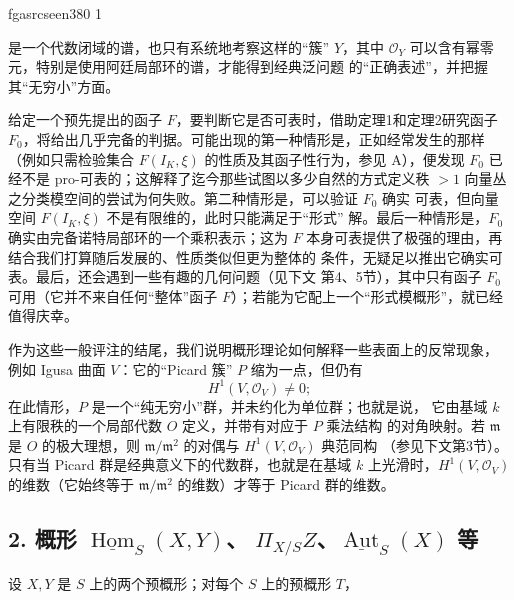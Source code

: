 \documentclass[12pt,twoside,openany]{book}
\numberwithin{equation}{section}
\newcommand{\fgaunitid}{unbound}
\newcommand{\src}[1]{%
  \phantomsection
  \hypertarget{src:\fgaunitid:#1}{}%
  \hypertarget{fga.\fgaunitid.p#1}{}%
  \ifcsname fgasrcseen#1\endcsname\else
    \expandafter\gdef\csname fgasrcseen#1\endcsname{1}%
    \hypertarget{src:#1}{}%
  \fi
  \marginpar{\raggedleft\footnotesize\sffamily #1}%
}
\newcommand{\fquote}[1]{“#1”}
\theoremstyle{plain}
\theoremstyle{definition}
\theoremstyle{remark}
\begin{document}
\src{380}
是一个代数闭域的谱，也只有系统地考察这样的\fquote{簇} $Y$，其中
$\mathcal O_Y$ 可以含有幂零元，特别是使用阿廷局部环的谱，才能得到经典泛问题
的\fquote{正确表述}，并把握其\fquote{无穷小}方面。

给定一个预先提出的函子 $F$，要判断它是否可表时，借助定理1和定理2研究函子
$F_0$，将给出几乎完备的判据。可能出现的第一种情形是，正如经常发生的那样
（例如只需检验集合 $F(I_K,\xi)$ 的性质及其函子性行为，参见 A），便发现
$F_0$ 已经不是 pro-可表的；这解释了迄今那些试图以多少自然的方式定义秩
$>1$ 向量丛之分类模空间的尝试为何失败。第二种情形是，可以验证 $F_0$ 确实
可表，但向量空间 $F(I_K,\xi)$ 不是有限维的，此时只能满足于\fquote{形式}
解。最后一种情形是，$F_0$ 确实由完备诺特局部环的一个乘积表示；这为 $F$
本身可表提供了极强的理由，再结合我们打算随后发展的、性质类似但更为整体的
条件，无疑足以推出它确实可表。最后，还会遇到一些有趣的几何问题（见下文
第4、5节），其中只有函子 $F_0$ 可用（它并不来自任何\fquote{整体}函子
$F$）；若能为它配上一个\fquote{形式模概形}，就已经值得庆幸。

作为这些一般评注的结尾，我们说明概形理论如何解释一些表面上的反常现象，
例如 Igusa 曲面 $V$：它的\fquote{Picard 簇} $P$ 缩为一点，但仍有
\[
  H^1(V,\mathcal O_V)\ne 0 ;
\]
在此情形，$P$ 是一个\fquote{纯无穷小}群，并未约化为单位群；也就是说，
它由基域 $k$ 上有限秩的一个局部代数 $O$ 定义，并带有对应于 $P$ 乘法结构
的对角映射。若 $\mathfrak m$ 是 $O$ 的极大理想，则
$\mathfrak m/\mathfrak m^2$ 的对偶与 $H^1(V,\mathcal O_V)$ 典范同构
（参见下文第3节）。只有当 Picard 群是经典意义下的代数群，也就是在基域
$k$ 上光滑时，$H^1(V,\mathcal O_V)$ 的维数（它始终等于
$\mathfrak m/\mathfrak m^2$ 的维数）才等于 Picard 群的维数。

\subsection*{2. 概形 $\underline{\operatorname{Hom}}_S(X,Y)$、
$\Pi_{X/S}Z$、$\underline{\operatorname{Aut}}_S(X)$ 等}

设 $X,Y$ 是 $S$ 上的两个预概形；对每个 $S$ 上的预概形 $T$，
\end{document}
